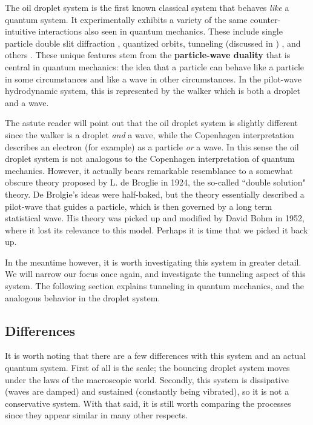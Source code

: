 The oil droplet system is the first known classical system that behaves \textit{like} a quantum system. It experimentally exhibits a variety of the same counter-intuitive interactions also seen in quantum mechanics. These include single particle double slit diffraction , quantized orbits, tunneling (discussed in ) , and others . These unique features stem from the \textbf{particle-wave duality} that is central in quantum mechanics: the idea that a particle can behave like a particle in some circumstances and like a wave in other circumstances. In the pilot-wave hydrodynamic system, this is represented by the walker which is both a droplet and a wave.

The astute reader will point out that the oil droplet system is slightly different since the walker is a droplet \textit{and} a wave, while the Copenhagen interpretation describes an electron (for example) as a particle \textit{or} a wave. In this sense the oil droplet system is not analogous to the Copenhagen interpretation of quantum mechanics. However, it actually bears remarkable resemblance to a somewhat obscure theory proposed by L. de Broglie in 1924, the so-called ``double solution" theory. De Brolgie's ideas were half-baked, but the theory essentially described a pilot-wave that guides a particle, which is then governed by a long term statistical wave. His theory was picked up and modified by David Bohm in 1952, where it lost its relevance to this model. Perhaps it is time that we picked it back up. 

In the meantime however, it is worth investigating this system in greater detail. We will narrow our focus once again, and investigate the tunneling aspect of this system. The following section explains tunneling in quantum mechanics, and the analogous behavior in the droplet system. 

\subsection{Differences}
It is worth noting that there are a few differences with this system and an actual quantum system. First of all is the scale; the bouncing droplet system moves under the laws of the macroscopic world. Secondly, this system is dissipative (waves are damped) and sustained (constantly being vibrated), so it is not a conservative system. With that said, it is still worth comparing the processes since they appear similar in many other respects.

